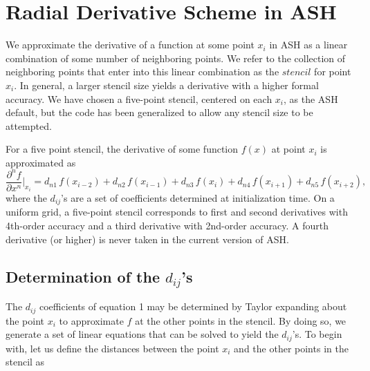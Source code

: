 \documentclass[12pt,letterpaper]{article}
\begin{document}
\section{Radial Derivative Scheme in ASH}

We approximate the derivative of a function at some point $x_i$ in ASH as a linear combination of some number of neighboring points.  We refer to the collection of neighboring points that enter into this linear combination as the $stencil$ for point $x_i$.  In general, a larger stencil size yields a derivative with a higher formal accuracy.  We have chosen a five-point stencil, centered on each $x_i$, as the ASH default, but the code has been generalized to allow any stencil size to be attempted.    

For a five point stencil, the derivative of some function $f(x)$ at point $x_i$ is approximated as
\begin{equation}
\frac{\partial^n f}{\partial x^n}|_{x_i} = d_{n1}\, f(x_{i-2})+ d_{n2}\, f(x_{i-1}) + d_{n3}\, f(x_i) + d_{n4}\, f(x_{i+1}) + d_{n5}\, f(x_{i+2}),
\label{dij}
\end{equation}
where the $d_{ij}$'s are a set of coefficients determined at initialization time.  On a uniform grid, a five-point stencil corresponds to first and second derivatives with 4th-order accuracy and a third derivative with 2nd-order accuracy.  A fourth derivative (or higher) is never taken in the current version of ASH.  

\subsection{Determination of the $d_{ij}$'s}
The $d_{ij}$ coefficients of equation 1 may be determined by Taylor expanding about the point $x_i$ to approximate $f$ at the other points in the stencil.  By doing so, we generate a set of linear equations that can be solved to yield the $d_{ij}$'s.  To begin with, let us define the distances between the point $x_i$ and the other points in the stencil as
\end{document}
